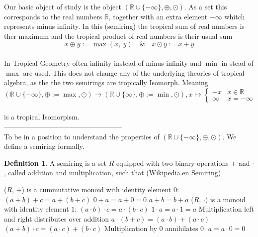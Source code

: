 \documentclass{article}
\theoremstyle{definition}
\newtheorem{definition}[theorem]{Definition}
\begin{document}
Our basic object of study is the object $( \mathbb{R} \cup \{- \infty \} , \oplus , \odot )$. As a set this corresponds to the real numbers $ \mathbb{R} $, together with an extra element $- \infty $ whitch represents minus infinity. In this (semiring) the tropical sum of real numbers is ther maximum and the tropical product of real numbers is their usual sum 
$$ x \oplus y := \max(x,\ y) \quad \& \quad x \odot y := x+y$$
--------------------------------------------------- \\
In Tropical Geometry often infinity instead of minus infinity and $\min$ in stead of $\max$ are used. This does not change any of the underlying theories of tropical algebra, as the the two semirings are tropically Isomorph. Meaning 
$$( \mathbb{R} \cup \{- \infty \} , \oplus := \max, \odot ) \to ( \mathbb{R} \cup \{ \infty \} , \oplus := \min , \odot ), x \mapsto \begin{cases} 
-x & x \in \mathbb{R}\\
\infty & x = - \infty
\end{cases}$$\\
is a tropical Isomorpism. \\
--------------------------------------------------- \\
To be in a position to understand the properties of $( \mathbb{R} \cup \{- \infty \} , \oplus , \odot )$. We define a semiring formally.
\begin{definition}
A semiring is a set $R$ equipped with two binary operations $+$ and $\cdot$, called addition and multiplication, such that (Wikipedia.en Semiring)
\begin{outline}
  \1 ($R$, $+$) is a cummutative monoid with identity element 0:
    \2 $(a + b) + c = a + (b + c)$
    \2 $0 + a = a + 0 = 0$
    \2 $a + b = b + a$
  \1 ($R$, $\cdot$) is a monoid with identity element $1$:
    \2 $(a \cdot b) \cdot c = a \cdot (b \cdot c)$
    \2 $ 1 \cdot a = a \cdot 1 = a $
  \1 Multiplication left and right distributes over addition
    \2 $ a \cdot (b + c) = (a \cdot b) + (a \cdot c)$
    \2 $ (a + b) \cdot c = (a \cdot c) + (b \cdot c)$
  \1 Multiplication by 0 annihilates
    \2 $ 0 \cdot a = a \cdot 0 = 0$
\end{outline}
\end{definition}
\end{document}

